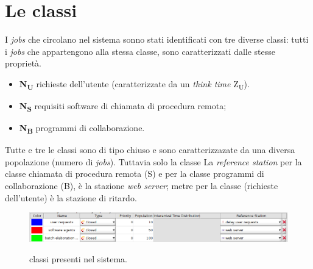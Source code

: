 \documentclass[../main.tex]{subfiles}
\begin{document}
    \section{Le classi}\label{sec:le-classi}
    I \textit{jobs} che circolano nel sistema sonno stati identificati con tre diverse classi: tutti i \textit{jobs} che appartengono alla stessa classe, sono caratterizzati dalle stesse proprietà.
    \begin{itemize}
        \item \textbf{N\textsubscript{U}} richieste dell'utente (caratterizzate da un \textit{think time} Z\textsubscript{U}).
        \item \textbf{N\textsubscript{S}} requisiti software di chiamata di procedura remota;
        \item \textbf{N\textsubscript{B}} programmi di collaborazione.
    \end{itemize}
    Tutte e tre le classi sono di tipo chiuso e sono caratterizzazate da una diversa popolazione (numero di \textit{jobs}). Tuttavia solo la classe
    La \textit{reference station} per la classe chiamata di procedura remota (S) e per la classe programmi di collaborazione (B), è la stazione \textit{web server}; metre per la classe (richieste dell'utente) è la stazione di ritardo.
    \begin{figure}[H]
        \centering
        \includegraphics[scale = 0.5]{assets/classes.png}\\
        \caption[\textit{Classi} del sistema]{classi presenti nel sistema.}
        \label{fig:clssi-del-sistema}
    \end{figure}
\end{document}
